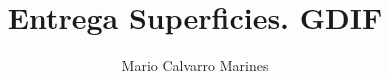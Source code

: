 \documentclass[10pt,a4paper]{article}
\title{\huge Entrega Superficies. GDIF}
\author{Mario Calvarro Marines}
\date{}
\begin{document}
\maketitle






{}

\end{document}

